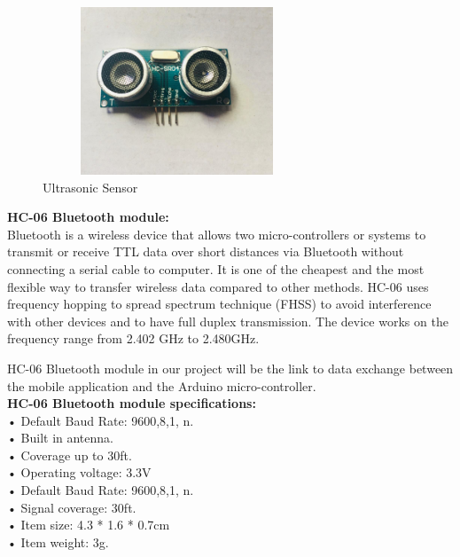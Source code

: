 \documentclass[12pt,a4paper]{report}
\begin{document}
\begin{figure}[H]
    \centering
    \graphicspath{ {./images/} }
    \includegraphics[width=8cm, height=5cm]{ultra.jpg}
    \caption{ Ultrasonic Sensor}
    \label{fig:mesh1}
\end{figure}
\bigskip

\textbf{{ HC-06 Bluetooth module:}}\\

Bluetooth is a wireless device that allows two micro-controllers or systems to transmit or receive TTL data over short distances via Bluetooth without connecting a serial cable to computer. It is one of the cheapest and the most flexible way to transfer wireless data compared to other methods. HC-06 uses frequency hopping to spread spectrum technique (FHSS) to avoid interference with other devices and to have full duplex transmission. The device works on the frequency range from 2.402 GHz to 2.480GHz\cite{Bluetooth}.

HC-06 Bluetooth module in our project will be the link to data exchange between the mobile application and the Arduino micro-controller.\\

\textbf{HC-06 Bluetooth module specifications:}\\

•	Default Baud Rate: 9600,8,1, n.\\
•	Built in antenna.\\
•	Coverage up to 30ft.\\
•	Operating voltage: 3.3V\\
•	Default Baud Rate: 9600,8,1, n.\\
•	Signal coverage: 30ft.\\
•	Item size: 4.3 * 1.6 * 0.7cm\\
•	Item weight: 3g.\\
\end{document}
